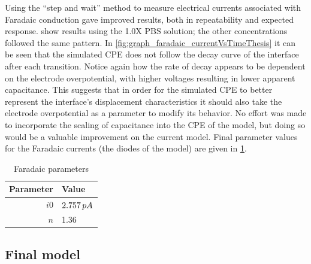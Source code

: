         Using the ``step and wait'' method to measure electrical currents associated with Faradaic conduction gave improved results, both in repeatability and expected response.
         show results using the 1.0X PBS solution; the other concentrations followed the same pattern.
        In \cref{fig:graph_faradaic_currentVsTimeThesis} it can be seen that the simulated CPE does not follow the decay curve of the interface after each transition.
        Notice again how the rate of decay appears to be dependent on the electrode overpotential, with higher voltages resulting in lower apparent capacitance.
        This suggests that in order for the simulated CPE to better represent the interface's displacement characteristics it should also take the electrode overpotential as a parameter to modify its behavior.
        No effort was made to incorporate the scaling of capacitance into the CPE of the model, but doing so would be a valuable improvement on the current model.
        Final parameter values for the Faradaic currents (the diodes of the model) are given in \cref{tab:FaradaicParams}.

        \begin{table}
          \caption{Faradaic parameters}
          \label{tab:FaradaicParams}
          \begin{center}
            \begin{tabular}{r | l}
                Parameter & Value \\
                \hline
                $i0$ & $2.757\thinspace pA$\\
                $n$ & 1.36\\
            \end{tabular}
          \end{center}
        \end{table}




    \subsection{Final model}


